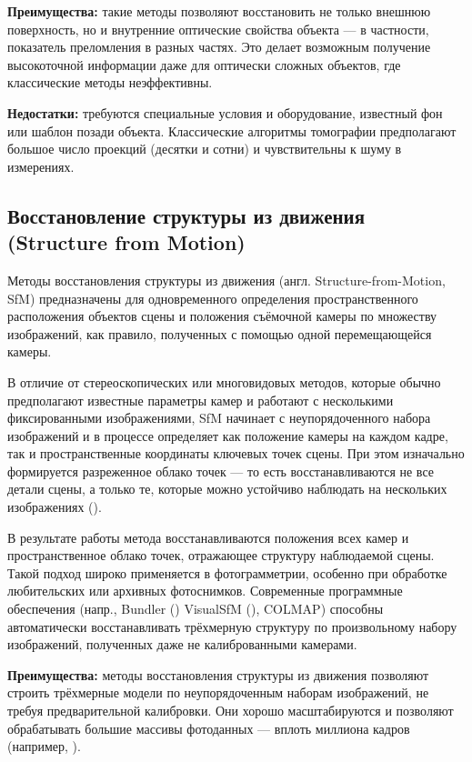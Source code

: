 \textbf{Преимущества:} такие методы позволяют восстановить не только внешнюю
поверхность, но и внутренние оптические свойства объекта — в частности,
показатель преломления в разных частях. Это делает возможным получение
высокоточной информации даже для оптически сложных объектов, где классические методы
неэффективны.

\textbf{Недостатки:} требуются специальные условия и оборудование,
известный фон или шаблон позади объекта. Классические алгоритмы томографии
предполагают большое число проекций (десятки и сотни) и чувствительны
к шуму в измерениях.

\subsection{Восстановление структуры из движения (Structure from Motion)}

Методы восстановления структуры из движения (англ. Structure-from-Motion,
 SfM) предназначены для одновременного определения пространственного
расположения объектов сцены и положения съёмочной камеры по множеству
изображений, как правило, полученных с помощью одной перемещающейся камеры.

В отличие от стереоскопических или многовидовых методов, которые обычно
предполагают известные параметры камер и работают с несколькими фиксированными
изображениями, SfM начинает с неупорядоченного
набора изображений и в процессе определяет как положение камеры на каждом кадре,
так и пространственные координаты ключевых точек сцены. При этом изначально
формируется разреженное облако точек — то есть восстанавливаются не все детали
сцены, а только те, которые можно устойчиво наблюдать на нескольких
изображениях (\cite{10.1109/CVPR.2016.4454}).

В результате работы метода восстанавливаются положения всех камер и
пространственное облако точек, отражающее структуру наблюдаемой сцены. Такой
подход широко применяется в фотограмметрии, особенно при обработке любительских
или архивных фотоснимков. Современные программные обеспечения (напр., Bundler
(\cite{10.1145/3596711.3596766}) VisualSfM (\cite{10.1109/3DV.2013.25}), COLMAP)
способны автоматически восстанавливать трёхмерную структуру по произвольному
набору изображений, полученных даже не калиброванными камерами.

\textbf{Преимущества:} методы восстановления структуры из движения позволяют
строить трёхмерные модели по неупорядоченным наборам изображений, не требуя
предварительной калибровки. Они хорошо масштабируются и позволяют обрабатывать
большие массивы фотоданных — вплоть миллиона кадров (например, \cite{10.1109/CVPR.2015.7298949}).

